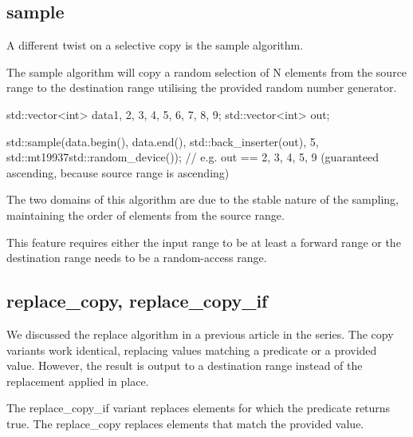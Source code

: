 \subsection{sample}

A different twist on a selective copy is the sample algorithm.



The sample algorithm will copy a random selection of N elements from the source range to the destination range utilising the provided random number generator.

\begin{box-note}
\begin{cppcode}
std::vector<int> data{1, 2, 3, 4, 5, 6, 7, 8, 9};
std::vector<int> out;

std::sample(data.begin(), data.end(), std::back_inserter(out),
            5, std::mt19937{std::random_device{}()});
// e.g. out == {2, 3, 4, 5, 9} (guaranteed ascending, because source range is ascending)
\end{cppcode}
\end{box-note}

The two domains of this algorithm are due to the stable nature of the sampling, maintaining the order of elements from the source range.

This feature requires either the input range to be at least a forward range or the destination range needs to be a random-access range.

\subsection{replace\_copy, replace\_copy\_if}

We discussed the replace algorithm in a previous article in the series. The copy variants work identical, replacing values matching a predicate or a provided value. However, the result is output to a destination range instead of the replacement applied in place.



The replace\_copy\_if variant replaces elements for which the predicate returns true. The replace\_copy replaces elements that match the provided value.

